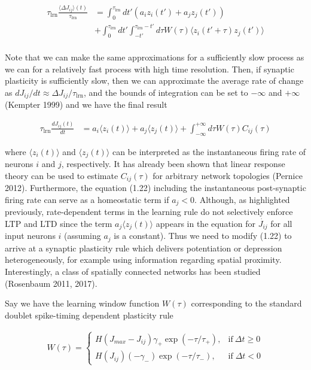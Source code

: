 \documentclass{ucetd}
\begin{document}
\begin{align*}
\tau_{\mathrm{lrn}}\frac{\langle \Delta J_{ij}\rangle(t)}{\tau_{\mathrm{lrn}}} &= \int_{0}^{\tau_{\mathrm{lrn}}} dt'\left(a_{i}z_{i}(t') + a_{j}z_{j}(t')\right)\\
&+ \int_{0}^{\tau_{\mathrm{lrn}}} dt'\int_{-t'}^{\tau_{\mathrm{lrn}}-t'} d\tau W(\tau)\langle z_{i}(t'+\tau)z_{j}(t')\rangle\\
\end{align*}

Note that we can make the same approximations for a sufficiently slow process as we can for a relatively fast process with high time resolution. Then, if synaptic plasticity is sufficiently slow, then we can approximate the average rate of change as $dJ_{ij}/dt \approx \Delta J_{ij}/\tau_{\mathrm{lrn}}$, and the bounds of integration can be set to $-\infty$ and $+\infty$ (Kempter 1999) and we have the final result


\begin{align}
\tau_{\mathrm{lrn}}\frac{d J_{ij}(t)}{dt} &=  a_{i}\langle z_{i}(t)\rangle  + a_{j}\langle z_{j}(t)\rangle + \int_{-\infty}^{+\infty} d\tau W(\tau)C_{ij}(\tau)
\end{align}

where $\langle z_{i}(t)\rangle$ and $\langle z_{j}(t)\rangle$ can be interpreted as the instantaneous firing rate of neurons $i$ and $j$, respectively. It has already been shown that linear response theory can be used to estimate $C_{ij}(\tau)$ for arbitrary network topologies (Pernice 2012). Furthermore, the equation (1.22) including the instantaneous post-synaptic firing rate can serve as a homeostatic term if $a_{j} < 0$. Although, as highlighted previously, rate-dependent terms in the learning rule do not selectively enforce LTP and LTD since the term $a_{j}\langle z_{j}(t)\rangle$ appears in the equation for $\dot{J_{ij}}$ for all input neurons $i$ (assuming $a_{j}$ is a constant). Thus we need to modify (1.22) to arrive at a synaptic plasticity rule which delivers potentiation or depression heterogeneously, for example using information regarding spatial proximity. Interestingly, a class of spatially connected networks has been studied (Rosenbaum 2011, 2017).


Say we have the learning window function $W(\tau)$ corresponding to the standard doublet spike-timing dependent plasticity rule

\begin{align*}
W(\tau) = \begin{cases}
      H(J_{max}-J_{ij})\gamma_{+}\exp(-\tau/\tau_{+}), & \text{if}\ \Delta t \geq 0 \\
       H(J_{ij})(-\gamma_{-})\exp(-\tau/\tau_{-}), & \text{if} \;\Delta t < 0
    \end{cases}
\end{align*}
\end{document}
